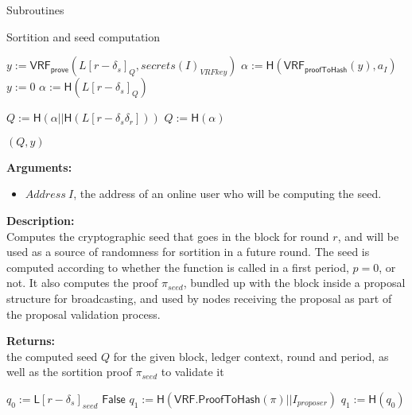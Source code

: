 \documentclass[10pt,a4paper]{article}
\begin{document}
\begin{section}{Subroutines}
\begin{subsection}{Sortition and seed computation}
\begin{algorithm}[H]
    \caption{\underline{Compute Seed And Proof}}
    \label{algo:compute-seed}
    \begin{algorithmic}[1]
             \State $y := \mathsf{VRF_{prove}}(L[r-\delta_s]_Q, secrets(I)_{VRFkey})$
             \State $\alpha := \mathsf{H}(\mathsf{VRF_{proofToHash}}(y), a_I)$
        \Else
            \State $y := 0$
            \State $\alpha := \mathsf{H}(L[r-\delta_s]_Q)$
        \EndIf

            \State $Q := \mathsf{H}(\alpha||\mathsf{H}(L[r-\delta_s\delta_r]))$
        \Else
            \State $Q := \mathsf{H}(\alpha)$
        \EndIf

         \Return $(Q, y)$
    \EndFunction
    \end{algorithmic}
\end{algorithm}


\noindent \textbf{Arguments:}
\begin{itemize}
    \item $Address \ I$, the address of an online user who will be computing the seed.
  \end{itemize}


\noindent \textbf{Description:}\\ Computes the cryptographic seed that goes in the block for round $r$,
and will be used as a source of randomness for sortition in a future round.
The seed is computed according to whether the function is called in a first period, $p = 0$, or not.
It also computes the proof $\pi_{seed}$, bundled up with the block inside a proposal structure for broadcasting, 
and used by nodes receiving the proposal as part of the proposal validation process.


\noindent \textbf{Returns:} \\
    the computed seed $Q$ for the given block, ledger context, round and period, as well as the sortition proof $\pi_{seed}$
    to validate it


\begin{algorithm}[H]
    \caption{\underline{Verify Seed}}
    \label{algo:verify-seed}
    \begin{algorithmic}[1]
        \State $q_0 := \mathsf{L}[r-\delta_s]_{seed}$
                    \Return $\mathsf{False}$
                \EndIf
                \State $q_1 := \mathsf{H}(\mathsf{VRF.ProofToHash}(\pi)||I_{proposer})$
            \Else
                \State $q_1 := \mathsf{H}(q_0)$
            \EndIf



\end{algorithmic}
\end{algorithm}
\end{subsection}
\end{section}
\end{document}
